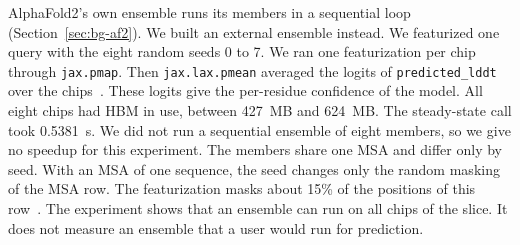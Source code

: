 AlphaFold2's own ensemble runs its members in a sequential loop (Section~\ref{sec:bg-af2}). We built an external
ensemble instead. We featurized one query with the eight random seeds 0 to 7. We ran one featurization per chip through \texttt{jax.pmap}. %
Then \texttt{jax.lax.pmean} averaged the logits of \texttt{predicted\_lddt} over the chips~\cite{jaxpmean}. These logits
give the per-residue confidence of the model. All eight chips had HBM in use, between 427~MB and 624~MB. %
The steady-state call took 0.5381~s. %
We did not run a sequential ensemble of eight members, so we give no speedup for this experiment. The members share one
MSA and differ only by seed.
With an MSA of one sequence, the seed changes only the random masking of the MSA row. The featurization masks about 15\% of the positions of this row~\cite{alphafoldrepo}. %
The experiment shows that an ensemble can run on all chips of the slice. It does not
measure an ensemble that a user would run for prediction.

